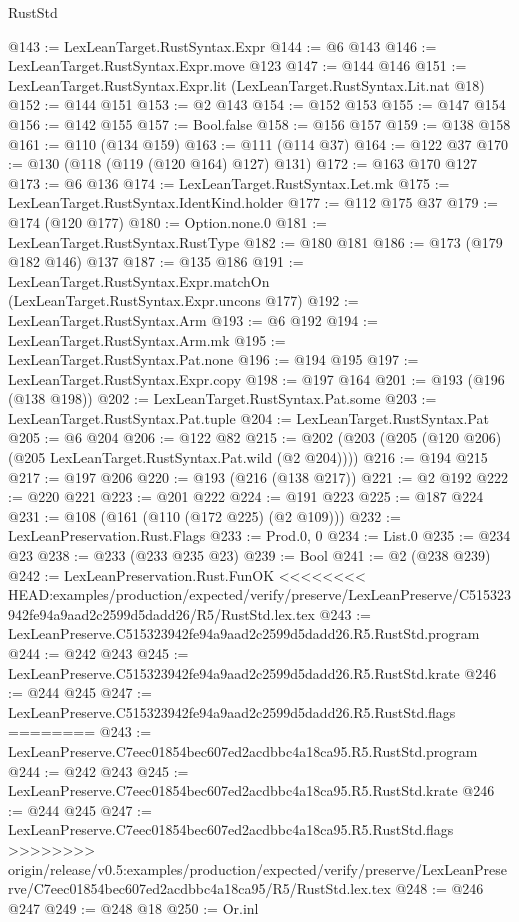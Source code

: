 \begin{lexlean}{RustStd}
\begin{coremodule}
{\begin{coremodule}
{{{{{{@143 := LexLeanTarget.RustSyntax.Expr
@144 := @6 @143
@146 := LexLeanTarget.RustSyntax.Expr.move @123
@147 := @144 @146
@151 := LexLeanTarget.RustSyntax.Expr.lit (LexLeanTarget.RustSyntax.Lit.nat @18)
@152 := @144 @151
@153 := @2 @143
@154 := @152 @153
@155 := @147 @154
@156 := @142 @155
@157 := Bool.false
@158 := @156 @157
@159 := @138 @158
@161 := @110 (@134 @159)
@163 := @111 (@114 @37)
@164 := @122 @37
@170 := @130 (@118 (@119 (@120 @164) @127) @131)
@172 := @163 @170 @127
@173 := @6 @136
@174 := LexLeanTarget.RustSyntax.Let.mk
@175 := LexLeanTarget.RustSyntax.IdentKind.holder
@177 := @112 @175 @37
@179 := @174 (@120 @177)
@180 := Option.none.{0}
@181 := LexLeanTarget.RustSyntax.RustType
@182 := @180 @181
@186 := @173 (@179 @182 @146) @137
@187 := @135 @186
@191 := LexLeanTarget.RustSyntax.Expr.matchOn (LexLeanTarget.RustSyntax.Expr.uncons @177)
@192 := LexLeanTarget.RustSyntax.Arm
@193 := @6 @192
@194 := LexLeanTarget.RustSyntax.Arm.mk
@195 := LexLeanTarget.RustSyntax.Pat.none
@196 := @194 @195
@197 := LexLeanTarget.RustSyntax.Expr.copy
@198 := @197 @164
@201 := @193 (@196 (@138 @198))
@202 := LexLeanTarget.RustSyntax.Pat.some
@203 := LexLeanTarget.RustSyntax.Pat.tuple
@204 := LexLeanTarget.RustSyntax.Pat
@205 := @6 @204
@206 := @122 @82
@215 := @202 (@203 (@205 (@120 @206) (@205 LexLeanTarget.RustSyntax.Pat.wild (@2 @204))))
@216 := @194 @215
@217 := @197 @206
@220 := @193 (@216 (@138 @217))
@221 := @2 @192
@222 := @220 @221
@223 := @201 @222
@224 := @191 @223
@225 := @187 @224
@231 := @108 (@161 (@110 (@172 @225) (@2 @109)))
@232 := LexLeanPreservation.Rust.Flags
@233 := Prod.{0, 0}
@234 := List.{0}
@235 := @234 @23
@238 := @233 (@233 @235 @23)
@239 := Bool
@241 := @2 (@238 @239)
@242 := LexLeanPreservation.Rust.FunOK
<<<<<<<< HEAD:examples/production/expected/verify/preserve/LexLeanPreserve/C515323942fe94a9aad2c2599d5dadd26/R5/RustStd.lex.tex
@243 := LexLeanPreserve.C515323942fe94a9aad2c2599d5dadd26.R5.RustStd.program
@244 := @242 @243
@245 := LexLeanPreserve.C515323942fe94a9aad2c2599d5dadd26.R5.RustStd.krate
@246 := @244 @245
@247 := LexLeanPreserve.C515323942fe94a9aad2c2599d5dadd26.R5.RustStd.flags
========
@243 := LexLeanPreserve.C7eec01854bec607ed2acdbbc4a18ca95.R5.RustStd.program
@244 := @242 @243
@245 := LexLeanPreserve.C7eec01854bec607ed2acdbbc4a18ca95.R5.RustStd.krate
@246 := @244 @245
@247 := LexLeanPreserve.C7eec01854bec607ed2acdbbc4a18ca95.R5.RustStd.flags
>>>>>>>> origin/release/v0.5:examples/production/expected/verify/preserve/LexLeanPreserve/C7eec01854bec607ed2acdbbc4a18ca95/R5/RustStd.lex.tex
@248 := @246 @247
@249 := @248 @18
@250 := Or.inl
}}}}}}
\end{coremodule}}
\end{coremodule}
\end{lexlean}
